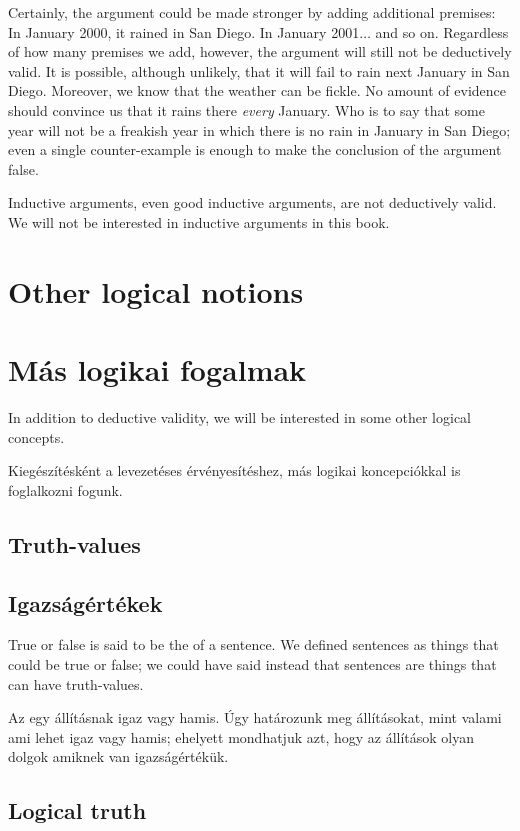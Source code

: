 Certainly, the argument could be made stronger by adding additional premises: In January 2000, it rained in San Diego. In January 2001$\ldots$ and so on. Regardless of how many premises we add, however, the argument will still not be deductively valid. It is possible, although unlikely, that it will fail to rain next January in San Diego. Moreover, we know that the weather can be fickle. No amount of evidence should convince us that it rains there \emph{every} January. Who is to say that some year will not be a freakish year in which there is no rain in January in San Diego; even a single counter-example is enough to make the conclusion of the argument false.

Inductive arguments, even good inductive arguments, are not deductively valid. We will not be interested in inductive arguments in this book.


\section*{Other logical notions}
\section{Más logikai fogalmak}

In addition to deductive validity, we will be interested in some other logical concepts.

Kiegészítésként a levezetéses érvényesítéshez, más logikai koncepciókkal is foglalkozni fogunk.

\subsection*{Truth-values}
\subsection{Igazságértékek}
True or false is said to be the  of a sentence. We defined sentences as things that could be true or false; we could have said instead that sentences are things that can have truth-values.

Az  egy állításnak igaz vagy hamis. Úgy határozunk meg állításokat, mint valami ami lehet igaz vagy hamis; ehelyett mondhatjuk azt, hogy az állítások olyan dolgok amiknek van igazságértékük.

\subsection*{Logical truth}
